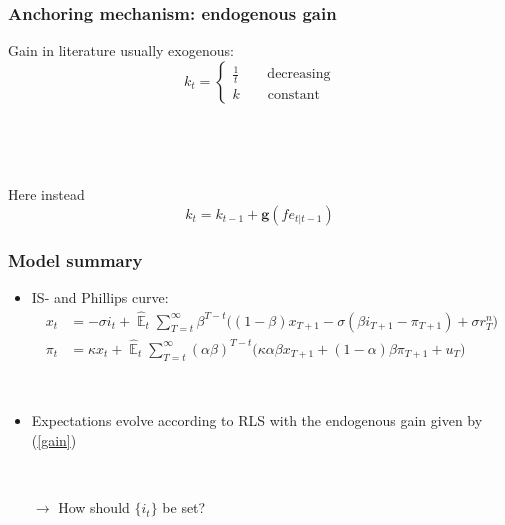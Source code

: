 \documentclass[11pt]{beamer}
\DeclareMathOperator{\E}{\mathbb{E}}
\begin{document}
\begin{frame}
	\frametitle{Anchoring mechanism: endogenous gain}
	\label{anchoring1}


Gain in literature usually exogenous: 
\begin{equation*}
k_t = \begin{cases}\frac{1}{t} \quad \quad \text{decreasing}\\
k \quad \quad \text{constant}
\end{cases}
\end{equation*}

\

\

Here instead
\begin{equation}
k_t = k_{t-1} + \mathbf{g}(fe_{t|t-1}) \label{gain}
\end{equation}


\vfill 

\hfill \hyperlink{g}{}



\end{frame}

\begin{frame}
	\frametitle{Model summary}
	\label{aggregate_LOMS}
\begin{itemize}
\item IS- and Phillips curve:	
 \begin{align}
x_t &=  -\sigma i_t +\hat{\E}_t \sum_{T=t}^{\infty} \beta^{T-t }\big( (1-\beta)x_{T+1} - \sigma(\beta i_{T+1} - \pi_{T+1}) +\sigma r_T^n \big)  \label{NKIS}  \\
\pi_t &= \kappa x_t +\hat{\E}_t \sum_{T=t}^{\infty} (\alpha\beta)^{T-t }\big( \kappa \alpha \beta x_{T+1} + (1-\alpha)\beta \pi_{T+1} + u_T\big) \label{NKPC} 
\end{align}
\hfill \hyperlink{derivations}{}

\

\item  Expectations evolve according to RLS with the endogenous gain given by (\ref{gain})

\

\item[$\rightarrow$] How should $\{ i_t \}$ be set?
\end{itemize}



\end{frame}
\end{document}

